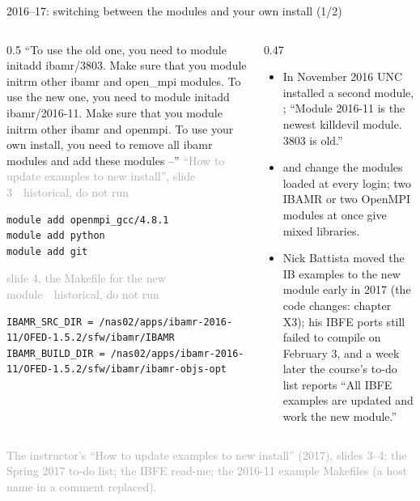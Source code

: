 \documentclass[aspectratio=169,11pt]{beamer}
\newcommand{\sourcecredit}[1]{\vfill\begin{flushright}\tiny\textcolor{DarkGray}{#1}\end{flushright}}
\newcommand{\hist}[1]{{\tiny\sffamily\textcolor{DarkGray}{#1\ \textbullet\ historical, do not run}}\par\nointerlineskip\vspace{0.3mm}}
\begin{document}
\begin{frame}[fragile]{2016--17: switching between the modules and your own install (1/2)}
\label{fr:switch}
\begin{columns}[T,onlytextwidth]
\begin{column}{0.5\textwidth}
\footnotesize ``To use the old one, you need to module initadd ibamr/3803. Make sure that you module initrm other ibamr and open\_mpi modules. To use the new one, you need to module initadd ibamr/2016-11. Make sure that you module initrm other ibamr and openmpi. To use your own install, you need to remove all ibamr modules and add these modules --''
\hist{``How to update examples to new install'', slide 3}
\begin{lstlisting}[style=hist]
module add openmpi_gcc/4.8.1
module add python
module add git
\end{lstlisting}
\hist{slide 4, the Makefile for the new module}
\begin{lstlisting}[style=hist]
IBAMR_SRC_DIR = /nas02/apps/ibamr-2016-11/OFED-1.5.2/sfw/ibamr/IBAMR
IBAMR_BUILD_DIR = /nas02/apps/ibamr-2016-11/OFED-1.5.2/sfw/ibamr/ibamr-objs-opt
\end{lstlisting}
\end{column}
\begin{column}{0.47\textwidth}
\footnotesize
\begin{itemize}\setlength{\itemsep}{3pt}
  \item In November 2016 UNC installed a second module, ; ``Module 2016-11 is the newest killdevil module. 3803 is old.''
  \item {} and  change the modules loaded at every login; two IBAMR or two OpenMPI modules at once give mixed libraries.
  \item Nick Battista moved the IB examples to the new module early in 2017 (the code changes: chapter X3); his IBFE ports still failed to compile on February 3, and a week later the course's to-do list reports ``All IBFE examples are updated and work the new module.''{}
\end{itemize}
\end{column}
\end{columns}
\sourcecredit{The instructor's ``How to update examples to new install'' (2017), slides 3--4; the Spring 2017 to-do list; the IBFE read-me; the 2016-11 example Makefiles (a host name in a comment replaced).}
\end{frame}
\end{document}
